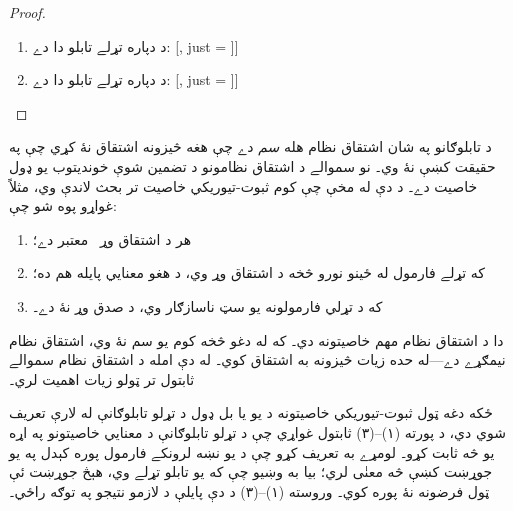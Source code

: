 \documentclass[12pt,a4paper,oneside]{report}
\newcommand{\olfileid}[3]{\gdef\pspart{#1}\gdef\pschapter{#2}\gdef\pssection{#3}}
\gdef\pspart{#2}\gdef\pschapter{#3}\gdef\pssection{}%
\newenvironment{oltableau}
  {\center\LTR\tableau{}}
  {\endtableau\endLTR\endcenter}
\theoremstyle{definition}
\newenvironment{explain}{}{}
\begin{document}
\label{olpseg:OLP-0108-B009:start}
\begin{proof}
\begin{enumerate}
\item د
   دپاره
  تړلے تابلو دا دے:
  \begin{oltableau}
    [\sFmla{\False}{\lexists[x][\formula{A}(x)]}, just = \TAss
      [\sFmla{\True}{\formula{A}(t)}, just = \TAss
        [\sFmla{\False}{\formula{A}(t)}, just = {\TRule{\False}{\lexists}[1]}, close]]]
    \end{oltableau}
\item د
   دپاره
  تړلے تابلو دا دے:
  \begin{oltableau}
    [, just = \TAss
      [\sFmla{\True}{\lforall[x][\formula{A}(x)]}, just = \TAss
        [\sFmla{\True}{\formula{A}(t)}, just = {\TRule{\True}{\lforall}[2]}, close]]]
    \end{oltableau}
\end{enumerate}
\end{proof}
\label{olpseg:OLP-0108-B009:end}

\label{olpseg:OLP-0109-B004:start}
\olfileid{fol}{tab}{sou}
\label{olpseg:OLP-0109-B004:end}

\label{olpseg:OLP-0109-B005:start}
\label{olpseg:OLP-0109-B005:end}

\label{olpseg:OLP-0109-B006:start}
\begin{explain}
د تابلوګانو په شان اشتقاق نظام هله \emph{سم} دے چې
هغه څيزونه اشتقاق نۀ کړي چې په حقيقت کښې نۀ وي۔ نو سموالے د
اشتقاق نظامونو د تضمين شوې خونديتوب يو ډول خاصيت دے۔
د دې له مخې چې کوم ثبوت-تيوريکي خاصيت تر بحث لاندې وي، مثلاً غواړو
پوه شو چې:
\begin{enumerate}
\item هر د اشتقاق وړ~ معتبر دے؛
\item که تړلے فارمول له ځينو نورو څخه د اشتقاق وړ وي، د هغو
  معنايي پايله هم ده؛
\item که د تړلي فارمولونه يو سټ ناسازګار وي، د صدق وړ نۀ دے۔
\end{enumerate}
دا د اشتقاق نظام مهم خاصيتونه دي۔ که له دغو څخه کوم يو
سم نۀ وي، اشتقاق نظام نيمګړے دے---له حده زيات څيزونه به
اشتقاق کوي۔ له دې امله د اشتقاق نظام سموالے ثابتول
تر ټولو زيات اهميت لري۔
\label{olpseg:OLP-0109-B006:end}

\label{olpseg:OLP-0109-B007:start}
ځکه دغه ټول ثبوت-تيوريکي خاصيتونه د يو يا بل ډول د تړلو
تابلوګانې له لارې تعريف شوي دي، د پورته (۱)--(۳) ثابتول غواړي
چې د تړلو تابلوګانې د معنايي خاصيتونو په اړه يو څه ثابت کړو۔
لومړے به تعريف کړو چې د يو نښه لرونکے فارمول پوره کېدل په يو
جوړښت کښې څه معنٰی لري؛ بيا به وښيو چې که يو تابلو تړلے وي،
هېڅ جوړښت ئې ټول فرضونه نۀ پوره کوي۔ وروسته (۱)--(۳) د دې پايلې
د لازمو نتيجو په توګه راځي۔
\end{explain}
\label{olpseg:OLP-0109-B007:end}
\end{document}

